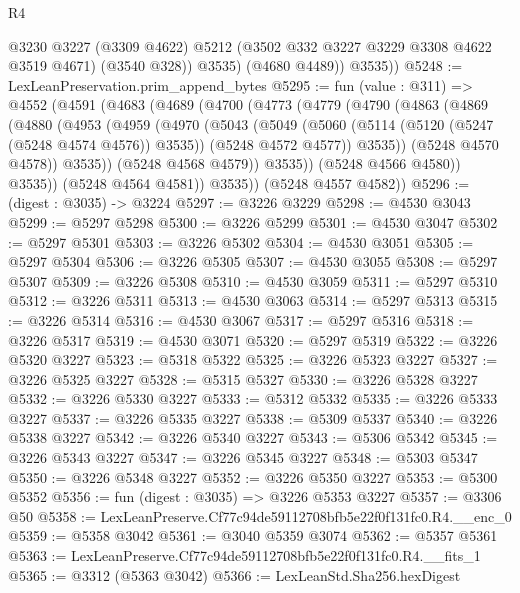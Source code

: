 \begin{lexlean}{R4}
\begin{coremodule}
              @3230
              @3227
              (@3309 @4622)
              @5212
              (@3502 @332 @3227 @3229 @3308 @4622 @3519 @4671)
              (@3540 @328))
            @3535)
          (@4680 @4489))
        @3535))
@5248 := LexLeanPreservation.prim_append_bytes
@5295 := fun (value : @311) =>
  @4552
    (@4591
      (@4683
        (@4689
          (@4700
            (@4773
              (@4779
                (@4790
                  (@4863
                    (@4869
                      (@4880
                        (@4953
                          (@4959
                            (@4970
                              (@5043
                                (@5049
                                  (@5060
                                    (@5114 (@5120 (@5247 (@5248 @4574 @4576)) @3535))
                                    (@5248 @4572 @4577))
                                  @3535))
                              (@5248 @4570 @4578))
                            @3535))
                        (@5248 @4568 @4579))
                      @3535))
                  (@5248 @4566 @4580))
                @3535))
            (@5248 @4564 @4581))
          @3535))
      (@5248 @4557 @4582))
@5296 := (digest : @3035) -> @3224
@5297 := @3226 @3229
@5298 := @4530 @3043
@5299 := @5297 @5298
@5300 := @3226 @5299
@5301 := @4530 @3047
@5302 := @5297 @5301
@5303 := @3226 @5302
@5304 := @4530 @3051
@5305 := @5297 @5304
@5306 := @3226 @5305
@5307 := @4530 @3055
@5308 := @5297 @5307
@5309 := @3226 @5308
@5310 := @4530 @3059
@5311 := @5297 @5310
@5312 := @3226 @5311
@5313 := @4530 @3063
@5314 := @5297 @5313
@5315 := @3226 @5314
@5316 := @4530 @3067
@5317 := @5297 @5316
@5318 := @3226 @5317
@5319 := @4530 @3071
@5320 := @5297 @5319
@5322 := @3226 @5320 @3227
@5323 := @5318 @5322
@5325 := @3226 @5323 @3227
@5327 := @3226 @5325 @3227
@5328 := @5315 @5327
@5330 := @3226 @5328 @3227
@5332 := @3226 @5330 @3227
@5333 := @5312 @5332
@5335 := @3226 @5333 @3227
@5337 := @3226 @5335 @3227
@5338 := @5309 @5337
@5340 := @3226 @5338 @3227
@5342 := @3226 @5340 @3227
@5343 := @5306 @5342
@5345 := @3226 @5343 @3227
@5347 := @3226 @5345 @3227
@5348 := @5303 @5347
@5350 := @3226 @5348 @3227
@5352 := @3226 @5350 @3227
@5353 := @5300 @5352
@5356 := fun (digest : @3035) => @3226 @5353 @3227
@5357 := @3306 @50
@5358 := LexLeanPreserve.Cf77c94de59112708bfb5e22f0f131fc0.R4.__enc_0
@5359 := @5358 @3042
@5361 := @3040 @5359 @3074
@5362 := @5357 @5361
@5363 := LexLeanPreserve.Cf77c94de59112708bfb5e22f0f131fc0.R4.__fits_1
@5365 := @3312 (@5363 @3042)
@5366 := LexLeanStd.Sha256.hexDigest

\end{coremodule}
\end{lexlean}

